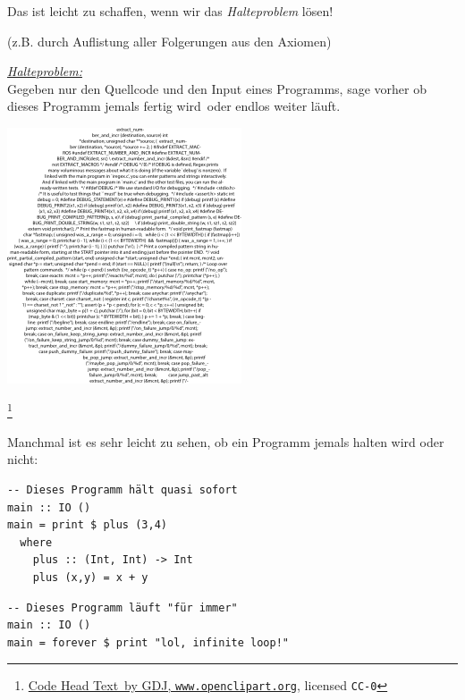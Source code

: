 \documentclass[aspectratio=43]{beamer}
\newcommand\blfootnote[1]{%
  \begingroup
  \renewcommand\thefootnote{}\footnote{#1}%
  \addtocounter{footnote}{-1}%
  \endgroup
}
\begin{document}
\begin{frame}
\vspace{20pt}
\begin{multicols}{2}

Das ist leicht zu schaffen, wenn wir das \emph{Halteproblem} lösen!
\smallskip

(z.B. durch Auflistung aller Folgerungen aus den Axiomen)
\bigskip

\emph{\underline{Halteproblem:}}\\

Gegeben nur den Quellcode und den Input eines Programms, sage vorher ob dieses Programm jemals \glqq fertig wird\grqq\ oder endlos weiter läuft.

\columnbreak

\includegraphics[scale=0.55]{images/CodeHeadText.png} 

\end{multicols}

\blfootnote{\href{https://openclipart.org/detail/274575/code-head-text}{\glqq Code Head Text\grqq\ by GDJ, \texttt{www.openclipart.org}}, licensed \texttt{CC-0}}

\end{frame}


\begin{frame}[fragile]

Manchmal ist es sehr leicht zu sehen, ob ein Programm jemals halten wird oder nicht:

\begin{framed}
\begin{verbatim}
-- Dieses Programm hält quasi sofort
main :: IO ()
main = print $ plus (3,4)
  where
    plus :: (Int, Int) -> Int
    plus (x,y) = x + y
\end{verbatim}
\end{framed}

\pause

\begin{framed}
\begin{verbatim}
-- Dieses Programm läuft "für immer"
main :: IO ()
main = forever $ print "lol, infinite loop!"
\end{verbatim}
\end{framed}

\end{frame}
\end{document}

